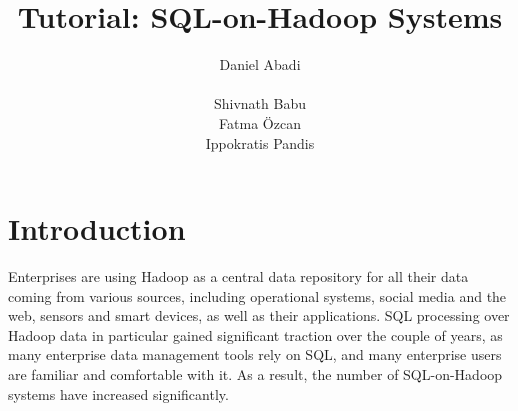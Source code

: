 \documentclass{vldb}
\begin{document}
\title{Tutorial: SQL-on-Hadoop Systems}


\author{
\alignauthor
Daniel Abadi\\
\\
\alignauthor 
\newcommand{\spshiv }{\hspace{-12mm}}
\spshiv Shivnath Babu\\
\spshiv {}
\spshiv {} 
\alignauthor
\newcommand{\spfatma}{\hspace{-15mm}}
\spfatma Fatma {\"O}zcan\\
\spfatma {}
\spfatma {}
\alignauthor
\newcommand{\spippo}{\hspace{-12mm}}
\spippo  Ippokratis Pandis\\
\spippo {}
\spippo {}
}
\maketitle
\section{Introduction}
Enterprises are using Hadoop as a central data repository for all their data coming from various sources,  including operational systems, social media and the web, sensors and smart devices, as well as their applications. SQL processing over Hadoop data in particular gained significant traction over the couple of years, as many enterprise data management tools rely on SQL,
and many enterprise users are familiar and comfortable with it. As a result, the number of SQL-on-Hadoop systems have increased significantly. 

\end{document}
